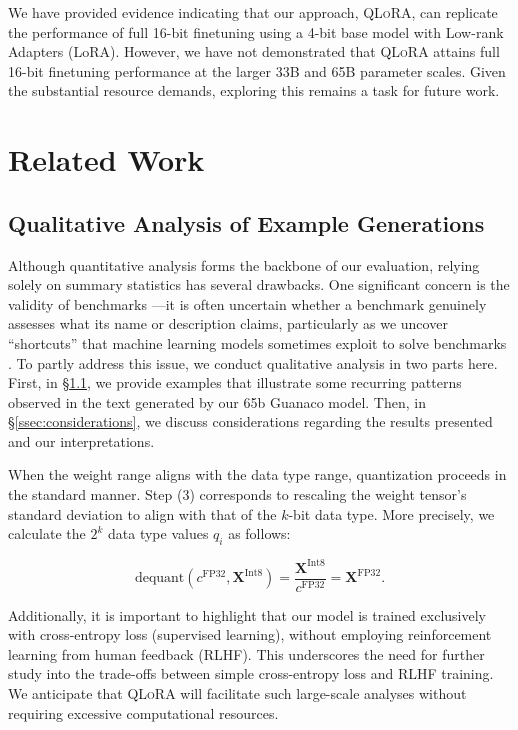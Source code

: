 We have provided evidence indicating that our approach, \textsc{QLoRA}, can replicate the performance of full 16-bit finetuning using a 4-bit base model with Low-rank Adapters (LoRA). However, we have not demonstrated that \textsc{QLoRA} attains full 16-bit finetuning performance at the larger 33B and 65B parameter scales. Given the substantial resource demands, exploring this remains a task for future work.

\section{Related Work}

\subsection{Qualitative Analysis of Example Generations}
\label{ssec:examples}

Although quantitative analysis forms the backbone of our evaluation, relying solely on summary statistics has several drawbacks. One significant concern is the validity of benchmarks \citep{liao2021we}—it is often uncertain whether a benchmark genuinely assesses what its name or description claims, particularly as we uncover “shortcuts” that machine learning models sometimes exploit to solve benchmarks \citep{gururangan2018annotation, poliak2018hypothesis}. To partly address this issue, we conduct qualitative analysis in two parts here. First, in \S\ref{ssec:examples}, we provide examples that illustrate some recurring patterns observed in the text generated by our 65b {Guanaco} model. Then, in \S\ref{ssec:considerations}, we discuss considerations regarding the results presented and our interpretations.

When the weight range aligns with the data type range, quantization proceeds in the standard manner. Step (3) corresponds to rescaling the weight tensor’s standard deviation to align with that of the $k$-bit data type. More precisely, we calculate the $2^k$ data type values $q_i$ as follows:

\begin{equation}
    \text{dequant}(c^{\text{FP32}}, \mathbf{X}^{\text{Int8}}) = \frac{\mathbf{X}^{\text{Int8}}}{c^{\text{FP32}}} = \mathbf{X}^{\text{FP32}}.
\end{equation}

Additionally, it is important to highlight that our model is trained exclusively with cross-entropy loss (supervised learning), without employing reinforcement learning from human feedback (RLHF). This underscores the need for further study into the trade-offs between simple cross-entropy loss and RLHF training. We anticipate that \textsc{QLoRA} will facilitate such large-scale analyses without requiring excessive computational resources.

